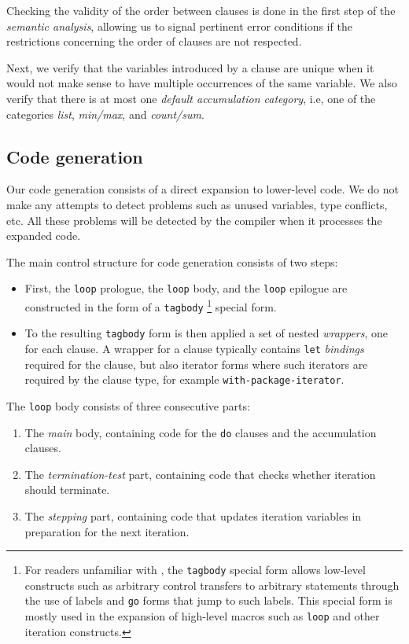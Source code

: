 Checking the validity of the order between clauses is done in the
first step of the \emph{semantic analysis}, allowing us to signal
pertinent error conditions if the restrictions concerning the order of
clauses are not respected.

Next, we verify that the variables introduced by a clause are unique
when it would not make sense to have multiple occurrences of the same
variable.  We also verify that there is at most one \emph{default
accumulation category}, i.e, one of the categories \emph{list},
\emph{min/max}, and \emph{count/sum}.

\subsection{Code generation}
\label{sec-our-technique-code generation}

Our code generation consists of a direct expansion to lower-level
\commonlisp{} code.  We do not make any attempts to detect problems
such as unused variables, type conflicts, etc.  All these problems
will be detected by the compiler when it processes the expanded code.

The main control structure for code generation consists of two steps:

\begin{itemize}
\item First, the \texttt{loop} prologue, the \texttt{loop} body, and
  the \texttt{loop} epilogue are constructed in the form of a
  \texttt{tagbody}%
  \footnote{For readers unfamiliar with \commonlisp{}, the
    \texttt{tagbody} special form allows low-level constructs such as
    arbitrary control transfers to arbitrary statements through the
    use of labels and \texttt{go} forms that jump to such labels.
    This special form is mostly used in the expansion of high-level
    macros such as \texttt{loop} and other iteration constructs.}
  special form.
\item To the resulting \texttt{tagbody} form is then applied a set of
  nested \emph{wrappers}, one for each clause.  A wrapper for a clause
  typically contains \texttt{let} \emph{bindings} required for the
  clause, but also iterator forms where such iterators are required by
  the clause type, for example \texttt{with-package-iterator}.
\end{itemize}

The \texttt{loop} body consists of three consecutive parts:

\begin{enumerate}
\item The \emph{main} body, containing code for the \texttt{do} clauses
  and the accumulation clauses.
\item The \emph{termination-test} part, containing code that checks
  whether iteration should terminate.
\item The \emph{stepping} part, containing code that updates iteration
  variables in preparation for the next iteration.
\end{enumerate}

